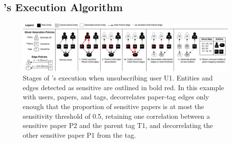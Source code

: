 \subsection{\sys's Execution Algorithm}
\begin{figure}[ht!]
    \centering
    \includegraphics[width=\textwidth]{img/algo}

    \caption{Stages of \sys's execution when unsubscribing user U1. Entities and edges detected as
    sensitive are outlined in bold red. In this example with users, papers,
    and tags, \sys decorrelates paper-tag edges only enough that the proportion of sensitive papers
    is at most the sensitivity threshold of 0.5, retaining one correlation between a sensitive
    paper P2 and the parent tag T1, and decorrelating the other sensitive paper P1 from the tag.}
    \label{fig:algo}
\end{figure}


